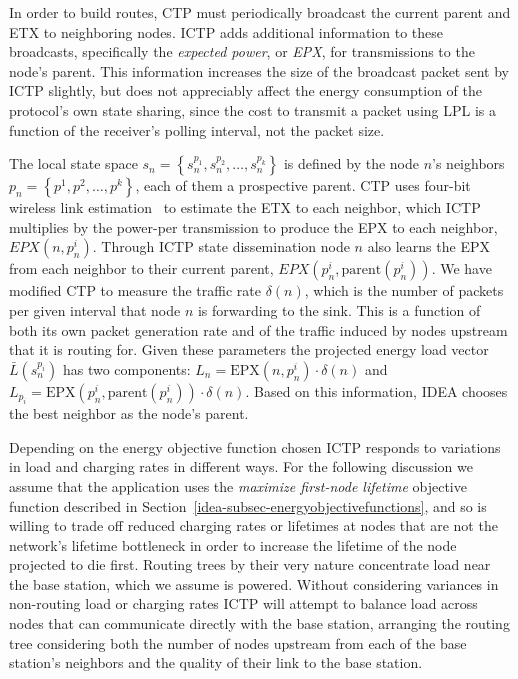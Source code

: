 In order to build routes, CTP must periodically broadcast the current parent
and ETX to neighboring nodes. ICTP adds additional information to these
broadcasts, specifically the \textit{expected power}, or \textit{EPX}, for
transmissions to the node's parent. This information increases the size of
the broadcast packet sent by ICTP slightly, but does not appreciably affect
the energy consumption of the protocol's own state sharing, since the cost to
transmit a packet using LPL is a function of the receiver's polling interval,
not the packet size.

The local state space $s_n = \left\{s_n^{p_1}, s_n^{p_2}, \ldots, s_n^{p_k}
\right\}$ is defined by the node $n$'s neighbors $p_n = \left\{p^1, p^2,
\ldots, p^k \right\}$, each of them a prospective parent. CTP uses four-bit
wireless link estimation~\cite{Fonseca07} to estimate the ETX to each
neighbor, which ICTP multiplies by the power-per transmission to produce the
EPX to each neighbor, $EPX(n, p_n^i)$. Through ICTP state dissemination node
$n$ also learns the EPX from each neighbor to their current parent,
$EPX(p_n^i, \textrm{parent}(p_n^i))$. We have modified CTP to measure the
traffic rate $\delta(n)$, which is the number of packets per given interval
that node $n$ is forwarding to the sink. This is a function of both its own
packet generation rate and of the traffic induced by nodes upstream that it
is routing for. Given these parameters the projected energy load vector
$\bar{L}(s_n^{p_i})$ has two components: $L_n = \textrm{EPX}(n, p_n^i) \cdot
\delta(n)$ and $L_{p_i} = \textrm{EPX}(p_n^i, \textrm{parent}(p_n^i)) \cdot
\delta(n)$. Based on this information, IDEA chooses the best neighbor as the
node's parent.

Depending on the energy objective function chosen ICTP responds to variations
in load and charging rates in different ways. For the following discussion we
assume that the application uses the \textit{maximize first-node lifetime}
objective function described in
Section~\ref{idea-subsec-energyobjectivefunctions}, and so is willing to
trade off reduced charging rates or lifetimes at nodes that are not the
network's lifetime bottleneck in order to increase the lifetime of the node
projected to die first. Routing trees by their very nature concentrate load
near the base station, which we assume is powered. Without considering
variances in non-routing load or charging rates ICTP will attempt to balance
load across nodes that can communicate directly with the base station,
arranging the routing tree considering both the number of nodes upstream from
each of the base station's neighbors and the quality of their link to the
base station.

